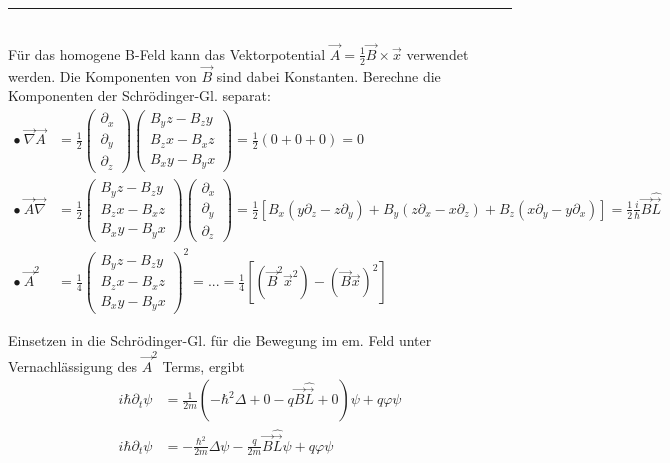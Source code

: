\documentclass{article}
\newcommand{\lr}[1]{\left(#1\right)}
\newcommand{\lreck}[1]{\left[#1\right]}
\begin{document}
{\color{violet}
\hrule
	\\
	Für das homogene B-Feld kann das Vektorpotential $\vec{A} = \frac{1}{2} \vec{B} \times \vec{x}$ verwendet werden. Die Komponenten von $\vec{B}$ sind dabei Konstanten. Berechne die Komponenten der Schrödinger-Gl. separat:
		\begin{align*}
			\bullet\ \vec{\nabla}\vec{A} &= \frac{1}{2}
			\begin{pmatrix}
				\partial_x \\ \partial_y \\ \partial_z
			\end{pmatrix}
			\begin{pmatrix}
				B_y z - B_z y \\ B_z x - B_x z \\ B_x y - B_y x
			\end{pmatrix} = \frac{1}{2} ( 0 + 0 + 0 ) = 0 \\
			\bullet\ \vec{A}\vec{\nabla} &= \frac{1}{2}
			\begin{pmatrix}
				B_y z - B_z y \\ B_z x - B_x z \\ B_x y - B_y x
			\end{pmatrix}
			\begin{pmatrix}
				\partial_x \\ \partial_y \\ \partial_z
			\end{pmatrix} = \frac{1}{2} \lreck{ B_x(y\partial_z - z\partial_y) + B_y(z\partial_x - x\partial_z) + B_z(x\partial_y - y\partial_x) } = \frac{1}{2} \frac{i}{\hbar} \vec{B} \hat{\vec{L}}\\
			\bullet\ \vec{A}^2 &= \frac{1}{4}
			\begin{pmatrix}
				B_y z - B_z y \\ B_z x - B_x z \\ B_x y - B_y x
			\end{pmatrix}^2 = ... = \frac{1}{4} \lreck{ (\vec{B}^2\vec{x}^2) - (\vec{B}\vec{x})^2 }
		\end{align*}
	
	Einsetzen in die Schrödinger-Gl. für die Bewegung im em. Feld unter Vernachlässigung des $\vec{A}^2$ Terms, ergibt
		\begin{align*}
			i\hbar \partial_t \psi &= \frac{1}{2m} \lr{ -\hbar^2\Delta + 0 - q \vec{B}\hat{\vec{L}} + 0 } \psi + q\varphi \psi \\
			i\hbar \partial_t \psi &= -\frac{\hbar^2}{2m}\Delta \psi - \frac{q}{2m} \vec{B}\hat{\vec{L}} \psi + q\varphi \psi
		\end{align*}

}
\end{document}
